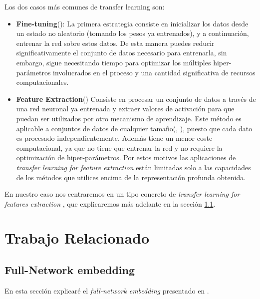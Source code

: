 \documentclass[12,twoside]{TFG-GM}
\theoremstyle{definition}
\theoremstyle{remark}
\begin{document}
Los dos casos más comunes de transfer learning son: 

\begin{itemize}
\item \textbf{Fine-tuning}(\cite{yosinski2014transferable}): La primera estrategia consiste en inicializar los datos desde un estado no aleatorio (tomando los pesos ya entrenados), y a continuación, entrenar la red sobre estos datos. 
De esta manera puedes reducir significativamente el conjunto de datos necesario para entrenarla, sin embargo, sigue necesitando tiempo para optimizar los múltiples hiper-parámetros involucrados en el proceso y una cantidad significativa de recursos computacionales. 


\item \textbf{Feature Extraction}(\cite{pan2010survey}) Consiste en procesar un conjunto de datos a través de una red neuronal ya entrenada y extraer valores de activación para que puedan ser utilizados por otro mecanismo de aprendizaje. Este método es aplicable a conjuntos de datos de cualquier tamaño(\cite{azizpour2016factors}, \cite{sharif2014cnn} ), puesto que cada dato es procesado independientemente. Además tiene un menor coste computacional, ya que no tiene que entrenar la red y no requiere la optimización de hiper-parámetros. Por estos motivos las aplicaciones de \textit{transfer learning for feature extraction} están limitadas solo a las  capacidades de los métodos que utilices encima de la representación profunda obtenida. 


\end{itemize}

En nuestro caso nos centraremos en un tipo concreto de \textit{transfer learning for features extraction} \cite{behaviourcnn}, que explicaremos más adelante en la sección \ref{sec:fne}. 




\newpage

\section{Trabajo Relacionado}
\label{sec:trabajorelacionado}
\subsection{Full-Network embedding} \label{sec:fne}

En esta sección explicaré el \textit{full-network embedding} presentado en \cite{fne}.
\end{document}
